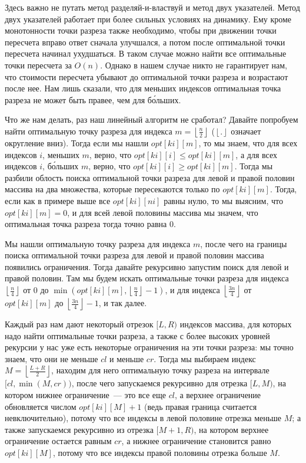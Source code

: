 \begin{observation}
    Здесь важно не путать метод разделяй-и-властвуй и метод двух указателей. Метод двух указателей работает при более сильных условиях на динамику. Ему кроме монотонности точки разреза также необходимо, чтобы при движении точки пересчета вправо ответ сначала улучшался, а потом после оптимальной точки пересчета начинал ухудшаться. В таком случае можно найти все оптимальные точки пересчета за $O(n)$. Однако в нашем случае никто не гарантирует нам, что стоимости пересчета убывают до оптимальной точки разреза и возрастают после нее. Нам лишь сказали, что для меньших индексов оптимальная точка разреза не может быть правее, чем для б\'{о}льших.
\end{observation}

Что же нам делать, раз наш линейный алгоритм не сработал? Давайте попробуем найти оптимальную точку разреза для индекса $m = \left\lfloor \frac{n}{2} \right\rfloor$ ($\left\lfloor . \right\rfloor$ означает округление вниз). Тогда если мы нашли $opt[ki][m]$, то мы знаем, что для всех индексов $i$, меньших $m$, верно, что $opt[ki][i] \le opt[ki][m]$, а для всех индексов $i$, б\'{о}льших $m$, верно, что $opt[ki][i] \ge opt[ki][m]$. Тогда мы разбили облость поиска оптимальной точки разреза для левой и правой половин массива на два множества, которые пересекаются только по $opt[ki][m]$. Тогда, если как в примере выше все $opt[ki][ni]$ равны нулю, то мы выясним, что $opt[ki][m] = 0$, и для всей левой половины массива мы значем, что оптимальная точка разреза тогда точно равна $0$.

Мы нашли оптимальную точку разреза для индекса $m$, после чего на границы поиска оптимальной точки разреза для левой и правой половин массива появились ограничения. Тогда давайте рекурсивно запустим поиск для левой и правой половин. Там мы будем искать оптимальные точки разреза для индекса $\left\lfloor \frac{n}{4} \right\rfloor$ от $0$ до $\min (opt[ki][m], \left\lfloor \frac{n}{4} \right\rfloor - 1)$, и для индекса $\left\lfloor \frac{3n}{4} \right\rfloor$ от $opt[ki][m]$ до $\left\lfloor \frac{3n}{4} \right\rfloor - 1$, и так далее.

Каждый раз нам дают некоторый отрезок $[L, R)$ индексов массива, для которых надо найти оптимальные точки разреза, а также с более высоких уровней рекурсии у нас уже есть некоторые ограничения на эти точки разреза: мы точно знаем, что они не меньше $cl$ и меньше $cr$. Тогда мы выбираем индекс $M = \left\lfloor \frac{L + R}{2}  \right\rfloor$, находим для него оптимальную точку разреза на интервале $[cl, \min(M, cr))$, после чего запускаемся рекурсивно для отрезка $[L, M)$, на котором нижнее ограничение~--- это все еще $cl$, а верхнее ограничение обновляется числом $opt[ki][M] + 1$ (ведь правая граница считается невключительно), потому что все индексы в левой половине отрезка меньше $M$; а также запускаемся рекурсивно из отрезка $[M + 1, R)$, на котором верхнее ограничение остается равным $cr$, а нижнее ограничение становится равно $opt[ki][M]$, потому что все индексы правой половины отрезка больше $M$.

